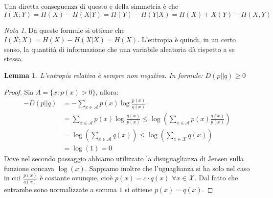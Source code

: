 \documentclass[a4paper,11pt]{book}
\theoremstyle{plain}
\newtheorem{lemma}[teo]{Lemma}
\theoremstyle{definition}
\theoremstyle{remark}
\newtheorem*{nota}{Nota}
\begin{document}
Una diretta conseguenza di questo e della simmetria è che 
\[
	I(X;Y)=H(X)-H(X|Y)=H(Y)-H(Y|X) = H(X)+X(Y)-H(X,Y)
\]
\begin{nota}
	Da queste formule si ottiene che $I(X;X) = H(X)-H(X|X) = H(X)$. L'entropia è quindi, in un certo senso, la quantità di informazione che una variabile aleatoria dà rispetto a se stessa.
\end{nota}
\begin{lemma}\label{dist:nonneg}
	L'entropia relativa è sempre non negativa. In formule: $D(p||q)\geq 0$
\end{lemma}
\begin{proof}
	Sia $A=\{x:p(x)>0\}$, allora:
	\begin{equation*}
		\begin{split}
		-D(p||q) & = -\sum_{x\in \mathcal{A}}{p(x)\log\frac{p(x)}{q(x)}}\\
		& = \sum_{x\in \mathcal{A}}{p(x)\log\frac{q(x)}{p(x)}} \leq \log\left(\sum_{x\in \mathcal{A}}{p(x)\frac{q(x)}{p(x)}}\right)\\
		& = \log\left(\sum_{x\in \mathcal{A}}{q(x)}\right)\leq \log \left(\sum_{x\in \mathcal{X}}{q(x)}\right)\\
		& = \log(1) = 0
		\end{split}
	\end{equation*}
	Dove nel secondo passaggio abbiamo utilizzato la disuguaglianza di Jensen sulla funzione concava $\log(x)$. Sappiamo inoltre che l'uguaglianza si ha solo nel caso in cui $\frac{p(x)}{q(x)}$ è costante ovunque, cioè $p(x) = c\cdot q(x)$ $\forall x \in \mathcal{X}$. Dal fatto che entrambe sono normalizzate a somma $1$ si ottiene $p(x)=q(x)$.
\end{proof}
\end{document}
